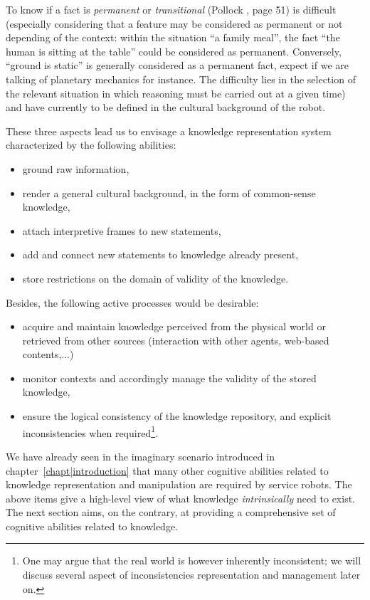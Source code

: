 To know if a fact is \emph{permanent} or \emph{transitional} (Pollock
\cite{Pollock1998}, page 51) is difficult (especially considering that a
feature may be considered as permanent or not depending of the context: within
the situation ``a family meal'', the fact ``the human is sitting at the
table'' could be considered as permanent. Conversely, ``ground is static'' is
generally considered as a permanent fact, expect if we are talking of planetary
mechanics for instance. The difficulty lies in the selection of the relevant
situation in which reasoning must be carried out at a given time) and have
currently to be defined in the cultural background of the robot.

These three aspects lead us to envisage a knowledge representation system
characterized by the following abilities: 
\begin{itemize}
	\item ground raw information,
	\item render a general cultural background, in the form of common-sense knowledge,
	\item attach interpretive frames to new statements,
	\item add and connect new statements to knowledge already present,
	\item store restrictions on the domain of validity of the knowledge.
\end{itemize}

Besides, the following active processes would be desirable:
\begin{itemize}

    \item acquire and maintain knowledge perceived from the physical world or
        retrieved from other sources (interaction with other agents, web-based
        contents,...)

    \item monitor contexts and accordingly manage the validity of the stored
        knowledge,

    \item ensure the logical consistency of the knowledge repository, and
    explicit inconsistencies when required\footnote{One may argue that the
    real world is however inherently inconsistent; we will discuss several
    aspect of inconsistencies representation and management later on.}.

\end{itemize}

We have already seen in the imaginary scenario introduced in
chapter~\ref{chapt|introduction} that many other cognitive abilities related to
knowledge representation and manipulation are required by service robots. The
above items give a high-level view of what knowledge \emph{intrinsically} need
to exist. The next section aims, on the contrary, at providing a
comprehensive set of cognitive abilities related to knowledge.


